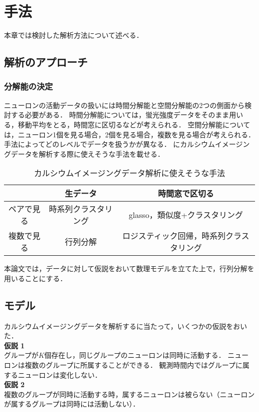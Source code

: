 \chapter{手法}
本章では検討した解析方法について述べる．
\section{解析のアプローチ}
\subsection{分解能の決定}
ニューロンの活動データの扱いには時間分解能と空間分解能の2つの側面から検討する必要がある．
時間分解能については，蛍光強度データをそのまま用いる，移動平均をとる，時間窓に区切るなどが考えられる．
空間分解能については，ニューロン1個を見る場合，2個を見る場合，複数を見る場合が考えられる．
手法によってどのレベルでデータを扱うかが異なる．
にカルシウムイメージングデータを解析する際に使えそうな手法を載せる．

\begin{table}[htb]
  \center
  \begin{tabular}{|c|cc|} \hline
    & 生データ & 時間窓で区切る \\ \hline
    ペアで見る & 時系列クラスタリング & glasso，類似度+クラスタリング\\
	  複数で見る & 行列分解 & ロジスティック回帰，時系列クラスタリング \\ \hline
  \end{tabular}
  \caption{カルシウムイメージングデータ解析に使えそうな手法}
  \label{tab:methods}
\end{table}

本論文では，データに対して仮説をおいて数理モデルを立てた上で，行列分解を用いることにする．

\section{モデル}
カルシウムイメージングデータを解析するに当たって，いくつかの仮説をおいた．
\\
\noindent \textbf{仮説 1}\\
グループが$K$個存在し，同じグループのニューロンは同時に活動する．
ニューロンは複数のグループに所属することができる．
観測時間内ではグループに属するニューロンは変化しない．\\
\textbf{仮説 2}\\
複数のグループが同時に活動する時，属するニューロンは被らない（ニューロンが属するグループは同時には活動しない）．
\\

